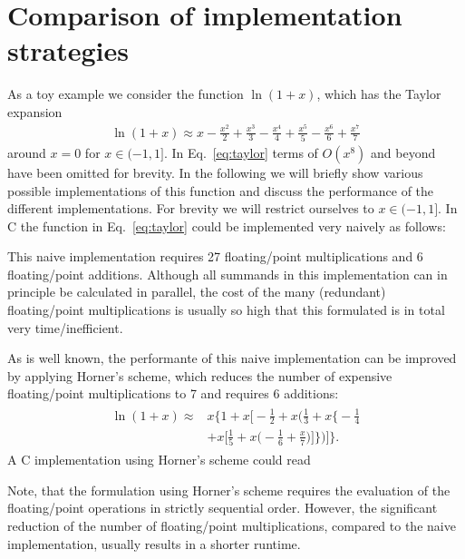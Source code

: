 \documentclass[10pt,DIV16,twocolumn,numbers=noenddot]{scrartcl}
\begin{document}
\section{Comparison of implementation strategies}
\label{sec:toymodel}

As a toy example we consider the function $\ln(1+x)$, which has the
Taylor expansion
%
\begin{align}
  \ln(1+x) \approx x - \frac{x^2}{2} + \frac{x^3}{3} - \frac{x^4}{4} + \frac{x^5}{5} - \frac{x^6}{6} + \frac{x^7}{7}
  \label{eq:taylor}
\end{align}
%
around $x=0$ for $x\in(-1,1]$.  In Eq.~\eqref{eq:taylor} terms of
$O(x^8)$ and beyond have been omitted for brevity.  In the following
we will briefly show various possible implementations of this function
and discuss the performance of the different implementations.  For
brevity we will restrict ourselves to $x\in(-1,1]$.  In C the function
in Eq.~\eqref{eq:taylor} could be implemented very naively as follows:
%

%
This naive implementation requires 27 floating\-/point multiplications
and 6 floating\-/point additions.  Although all summands in this
implementation can in principle be calculated in parallel, the cost of
the many (redundant) floating\-/point multiplications is usually so
high that this formulated is in total very time\-/inefficient.

As is well known, the performante of this naive implementation can be
improved by applying Horner's scheme, which reduces the number of
expensive floating\-/point multiplications to 7 and requires 6
additions:
%
\begin{align}
\begin{split}
  \ln(1+x) \approx{}& x \Bigg\{1 + x \Bigg[-\frac{1}{2} + x \Bigg(\frac{1}{3} + x \Bigg\{-\frac{1}{4} \\
  &+ x \Bigg[\frac{1}{5} + x\Bigg(-\frac{1}{6} + \frac{x}{7}\Bigg)\Bigg]\Bigg\}\Bigg)\Bigg]\Bigg\}.
\end{split}\label{eq:horner}%
\end{align}
%
A C implementation using Horner's scheme could read
%

%
Note, that the formulation using Horner's scheme requires the
evaluation of the floating\-/point operations in strictly sequential
order.  However, the significant reduction of the number of
floating\-/point multiplications, compared to the naive
implementation, usually results in a shorter runtime.
\end{document}
